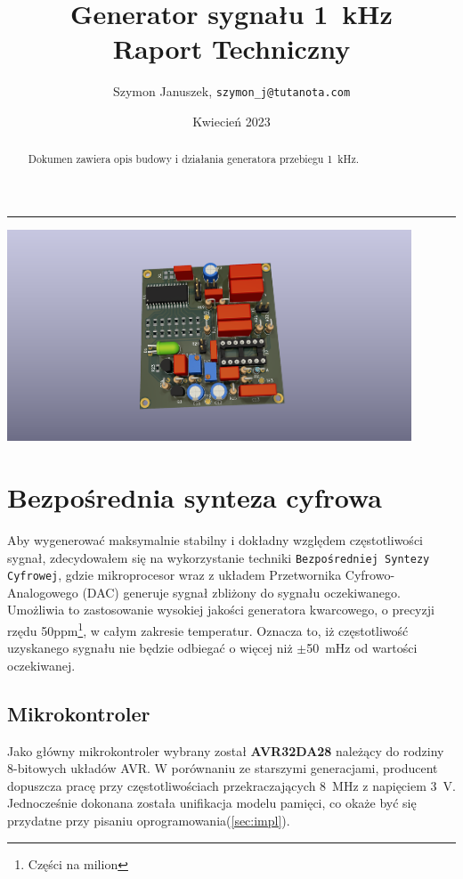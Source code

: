 \documentclass[12pt, a4paper]{article}
\title{
	Generator sygnału \qty{1}{\kHz}\\
	\large Raport Techniczny
}
\author{Szymon Januszek, \texttt{szymon\_j@tutanota.com}}
\date{Kwiecień 2023}
\begin{document}
\normalfont
{}
\maketitle
\hrule

\begin{abstract}
	Dokumen zawiera opis budowy i działania generatora przebiegu \qty{1}{\kHz}.
\end{abstract}

\begin{center}
	\includegraphics[width=0.9\textwidth]{board_render_1.png}
\end{center}


\newpage

\tableofcontents

\newpage

\section{Bezpośrednia synteza cyfrowa}

Aby wygenerować maksymalnie stabilny i dokładny względem częstotliwości sygnał, 
zdecydowałem się na wykorzystanie techniki \verb|Bezpośredniej Syntezy Cyfrowej|, 
gdzie mikroprocesor wraz z układem Przetwornika Cyfrowo-Analogowego (DAC) generuje sygnał zbliżony do sygnału oczekiwanego. 
Umożliwia to zastosowanie wysokiej jakości generatora kwarcowego, o precyzji rzędu 50ppm\footnote{Części na milion}, 
w całym zakresie temperatur. Oznacza to, iż częstotliwość uzyskanego sygnału nie będzie odbiegać o więcej niż $\pm$\qty{50}{\mHz} od wartości oczekiwanej. 

\subsection{Mikrokontroler}
Jako główny mikrokontroler wybrany został \textbf{AVR32DA28}\cite{avr-datasheet} należący do rodziny 8-bitowych układów AVR.
W porównaniu ze starszymi generacjami, producent dopuszcza pracę przy częstotliwościach przekraczających \qty{8}{\MHz} z napięciem \qty{3}{\volt}.
Jednocześnie dokonana została unifikacja modelu pamięci, co okaże być się przydatne przy pisaniu oprogramowania(\ref{sec:impl}).
\end{document}

